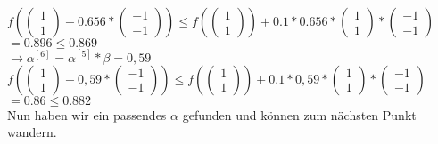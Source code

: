 \documentclass[a4paper, 11pt]{article}
\begin{document}
\begin{enumerate}
	$f( \left( \begin{array}{c} 1 \\ 1 \end{array} \right) + 0.656 * \left( \begin{array}{c} -1 \\ -1 \end{array} \right)) \leq f(\left( \begin{array}{c} 1 \\ 1 \end{array} \right)) + 0.1 * 0.656 *  \left( \begin{array}{c} 1 \\ 1 \end{array} \right) * \left( \begin{array}{c} -1 \\ -1 \end{array} \right)$ \\
	$= 0.896 \leq 0.869$ \\
	$\rightarrow \alpha^{[6]} = \alpha^{[5]} * \beta = 0,59$ \\
	
	$f( \left( \begin{array}{c} 1 \\ 1 \end{array} \right) + 0,59 * \left( \begin{array}{c} -1 \\ -1 \end{array} \right)) \leq f(\left( \begin{array}{c} 1 \\ 1 \end{array} \right)) + 0.1 * 0,59 *  \left( \begin{array}{c} 1 \\ 1 \end{array} \right) * \left( \begin{array}{c} -1 \\ -1 \end{array} \right)$ \\
	$= 0.86 \leq 0.882$ \\
	Nun haben wir ein passendes $\alpha$ gefunden und können zum nächsten Punkt wandern.
	
	\begin{figure}
\centering
{}
\end{figure}
\end{enumerate}
\end{document}
